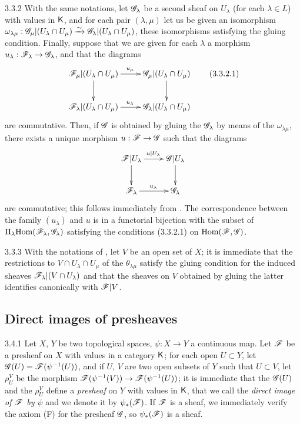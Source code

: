 \begin{env}{3.3.2}
\label{env-0.3.3.2}
With the same notations, let $\mathscr{G}_\lambda$ be a second sheaf on $U_\lambda$ (for each
$\lambda\in L$) with values in $\mathsf{K}$, and for each pair $(\lambda,\mu)$ let us be given an
isomorphism
$\omega_{\lambda\mu}:\mathscr{G}_\mu|(U_\lambda\cap U_\mu)
\xrightarrow{\sim}\mathscr{G}_\lambda|(U_\lambda\cap U_\mu)$, these isomorphisms satisfying the
gluing condition. Finally, suppose that we are given for each $\lambda$ a morphism
$u_\lambda:\mathscr{F}_\lambda\to\mathscr{G}_\lambda$, and that the diagrams
\[
  \xymatrix{
    \sh{F}_\mu|(U_\lambda\cap U_\mu)\ar[r]^{u_\mu}\ar[d] &
    \sh{G}_\mu|(U_\lambda\cap U_\mu)\ar[d]\\
    \sh{F}_\lambda|(U_\lambda\cap U_\mu)\ar[r]^{u_\lambda} &
    \sh{G}_\lambda|(U_\lambda\cap U_\mu)
  }
  \tag{3.3.2.1}
\]
are commutative. Then, if $\mathscr{G}$ is obtained by gluing the $\mathscr{G}_\lambda$ by means of the
$\omega_{\lambda\mu}$, there exists a unique morphism $u:\mathscr{F}\to\mathscr{G}$ such that the
diagrams
\[
  \xymatrix{
    \sh{F}|U_\lambda\ar[r]^{u|U_\lambda}\ar[d] &
    \sh{G}|U_\lambda\ar[d]\\
    \sh{F}_\lambda\ar[r]^{u_\lambda} &
    \sh{G}_\lambda
  }
\]
are commutative; this follows immediately from . The correspondence between
the family $(u_\lambda)$ and $u$ is in a functorial bijection with the subset of
$\Pi_\lambda{\mathop{\mathrm{Hom}}\nolimits}(\mathscr{F}_\lambda,\mathscr{G}_\lambda)$ satisfying the conditions (3.3.2.1) on
${\mathop{\mathrm{Hom}}\nolimits}(\mathscr{F},\mathscr{G})$.
\end{env}

\begin{env}{3.3.3}
\label{env-0.3.3.3}
With the notations of , let $V$ be an open set of $X$; it is immediate that
the restrictions to $V\cap U_\lambda\cap U_\mu$ of the $\theta_{\lambda\mu}$ satisfy the
gluing condition for the induced sheaves $\mathscr{F}_\lambda|(V\cap U_\lambda)$ and that the
sheaves on $V$ obtained by gluing the latter identifies canonically with $\mathscr{F}|V$.
\end{env}

\subsection{Direct images of presheaves}
\label{0-prelim-3.4}

\begin{env}{3.4.1}
\label{env-0.3.4.1}
Let $X$, $Y$ be two topological spaces, $\psi:X\to Y$ a continuous map. Let $\mathscr{F}$ be a
presheaf on $X$ with values in a category $\mathsf{K}$; for each open $U\subset Y$, let
$\mathscr{G}(U)=\mathscr{F}(\psi^{-1}(U))$, and if $U$, $V$ are two open subsets of $Y$ such that
$U\subset V$, let $\rho_U^V$ be the morphism $\mathscr{F}(\psi^{-1}(V))\to\mathscr{F}(\psi^{-1}(U))$;
it is immediate that the $\mathscr{G}(U)$ and the $\rho_U^V$ define a \emph{presheaf} on $Y$ with
values in $\mathsf{K}$, that we call the \emph{direct image of $\mathscr{F}$ by $\psi$} and we denote it
by $\psi_*(\mathscr{F})$. If $\mathscr{F}$ is a sheaf, we immediately verify the axiom (F) for the
presheaf $\mathscr{G}$, so $\psi_*(\mathscr{F})$ is a sheaf.
\end{env}

